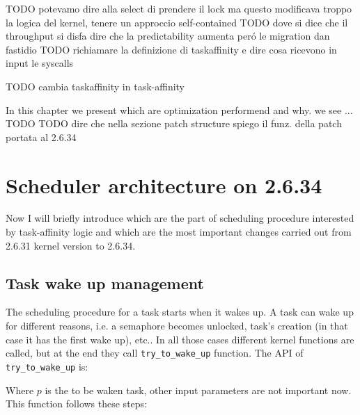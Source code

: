 TODO potevamo dire alla select di prendere il lock ma questo modificava troppo la logica del kernel, tenere un approccio self-contained
TODO dove si dice che il throughput si disfa dire che la predictability aumenta per\'o le migration dan fastidio
TODO richiamare la definizione di taskaffinity e dire cosa ricevono in input le syscalls

TODO cambia taskaffinity in task-affinity



In this chapter we present which are optimization performend and why. we see ... TODO 
TODO dire che nella sezione patch structure spiego il funz. della patch portata al 2.6.34

\section{Scheduler architecture on 2.6.34}

Now I will briefly introduce which are the part of scheduling procedure 
interested by task-affinity logic and which are the most important changes 
carried out from 2.6.31 kernel version to 2.6.34.

\subsection{Task wake up management}

The scheduling procedure for a task starts when it wakes up. A task can wake up
for different reasons, i.e. a semaphore becomes unlocked, task's creation
(in that case it has the first wake up), etc.. In all those cases different
kernel functions are called, but at the end they call 
\texttt{try\_to\_wake\_up} function. The API of \texttt{try\_to\_wake\_up} is:

\lstset{basicstyle=\footnotesize, language=c, captionpos=b, frame=single, label=lis:APIttwu}


Where $p$ is the to be waken task, other input parameters are not important now.
This function follows these steps:

